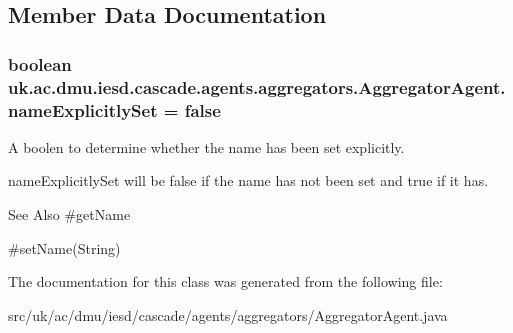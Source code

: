 \subsection{Member Data Documentation}
\hypertarget{classuk_1_1ac_1_1dmu_1_1iesd_1_1cascade_1_1agents_1_1aggregators_1_1_aggregator_agent_a4ff8e9e3fb5095e5545ada79a037ad7a}{
\subsubsection[{name\-Explicitly\-Set}]{\setlength{\rightskip}{0pt plus 5cm}boolean uk.\-ac.\-dmu.\-iesd.\-cascade.\-agents.\-aggregators.\-Aggregator\-Agent.\-name\-Explicitly\-Set = false\hspace{0.3cm}{\ttfamily [protected]}}}\label{classuk_1_1ac_1_1dmu_1_1iesd_1_1cascade_1_1agents_1_1aggregators_1_1_aggregator_agent_a4ff8e9e3fb5095e5545ada79a037ad7a}


A boolen to determine whether the name has been set explicitly. 

{\ttfamily name\-Explicitly\-Set} will be false if the name has not been set and true if it has.

\begin{DoxySeeAlso}{See Also}
\#get\-Name 

\#set\-Name(\-String) 
\end{DoxySeeAlso}


The documentation for this class was generated from the following file\-:\begin{DoxyCompactItemize}
\item 
src/uk/ac/dmu/iesd/cascade/agents/aggregators/Aggregator\-Agent.\-java\end{DoxyCompactItemize}
